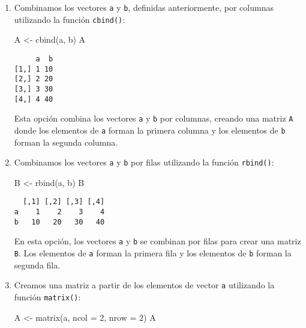 \documentclass[
  a4paper,
]{article}
\newenvironment{Shaded}{}{}
\newcommand{\AttributeTok}[1]{\textcolor[rgb]{0.84,0.23,0.29}{#1}}
\newcommand{\DecValTok}[1]{\textcolor[rgb]{0.00,0.36,0.77}{#1}}
\newcommand{\FunctionTok}[1]{\textcolor[rgb]{0.44,0.26,0.76}{#1}}
\newcommand{\NormalTok}[1]{\textcolor[rgb]{0.14,0.16,0.18}{#1}}
\newcommand{\OtherTok}[1]{\textcolor[rgb]{0.44,0.26,0.76}{#1}}
\begin{document}
\begin{enumerate}
\def\labelenumi{\arabic{enumi}.}
\item
  Combinamos los vectores \texttt{a} y \texttt{b}, definidas
  anteriormente, por columnas utilizando la función \texttt{cbind()}:

\begin{Shaded}
\begin{Highlighting}[]
\NormalTok{A }\OtherTok{\textless{}{-}} \FunctionTok{cbind}\NormalTok{(a, b)}
\NormalTok{A}
\end{Highlighting}
\end{Shaded}

\begin{verbatim}
     a  b
[1,] 1 10
[2,] 2 20
[3,] 3 30
[4,] 4 40
\end{verbatim}

  Esta opción combina los vectores \texttt{a} y \texttt{b} por columnas,
  creando una matriz \texttt{A} donde los elementos de \texttt{a} forman
  la primera columna y los elementos de \texttt{b} forman la segunda
  columna.
\item
  Combinamos los vectores \texttt{a} y \texttt{b} por filas utilizando
  la función \texttt{rbind()}:

\begin{Shaded}
\begin{Highlighting}[]
\NormalTok{B }\OtherTok{\textless{}{-}} \FunctionTok{rbind}\NormalTok{(a, b)}
\NormalTok{B}
\end{Highlighting}
\end{Shaded}

\begin{verbatim}
  [,1] [,2] [,3] [,4]
a    1    2    3    4
b   10   20   30   40
\end{verbatim}

  En esta opción, los vectores \texttt{a} y \texttt{b} se combinan por
  filas para crear una matriz \texttt{B}. Los elementos de \texttt{a}
  forman la primera fila y los elementos de \texttt{b} forman la segunda
  fila.
\item
  Creamos una matriz a partir de los elementos de vector \texttt{a}
  utilizando la función \texttt{matrix()}:

\begin{Shaded}
\begin{Highlighting}[]
\NormalTok{A }\OtherTok{\textless{}{-}} \FunctionTok{matrix}\NormalTok{(a, }\AttributeTok{ncol =} \DecValTok{2}\NormalTok{, }\AttributeTok{nrow =} \DecValTok{2}\NormalTok{)}
\NormalTok{A}
\end{Highlighting}
\end{Shaded}


\end{enumerate}
\end{document}
